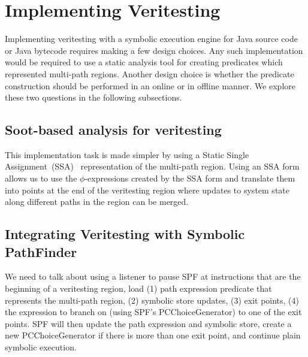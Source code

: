 \section{Implementing Veritesting}
Implementing veritesting with a symbolic execution engine for Java
source code or Java bytecode requires making a few design choices.
%
Any such implementation would be required to use a static analysis tool
for creating predicates which represented multi-path regions.
%
Another design choice is whether the predicate construction should be
performed in an online or in offline manner.
%
We explore these two questions in the following subsections.
%
\subsection{Soot-based analysis for veritesting}
%
This implementation task is made simpler by using a Static Single
Assignment~(SSA)~\cite{ssa} representation of the multi-path region.
%
Using an SSA form allows us to use the $\phi$-expressions created by the
SSA form and translate them into points at the end of the veritesting
region where updates to system state along different paths in the region
can be merged.
%
\subsection{Integrating Veritesting with Symbolic PathFinder}
%
We need to talk about using a listener to pause SPF at instructions that
are the beginning of a veritesting region, load (1) path expression
predicate that represents the multi-path region, (2) symbolic store
updates, (3) exit points, (4) the expression to branch on (using
SPF's PCChoiceGenerator) to one of the exit points.
SPF will then update the path expression and symbolic store, create a
new PCChoiceGenerator if there is more than one exit point, and continue
plain symbolic execution.

